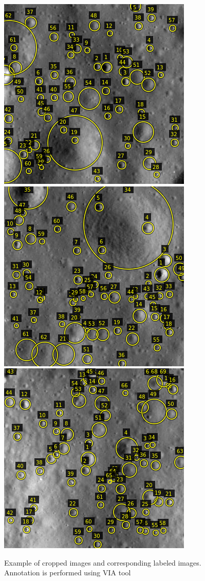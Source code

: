 \documentclass[11pt]{article}
\begin{document}
\begin{figure}[ht!]
	\includegraphics[width=.3\textwidth]{files/annotation/66n.png}\hfill
	\includegraphics[width=.3\textwidth]{files/annotation/29n.png}\hfill
	\includegraphics[width=.3\textwidth]{files/annotation/20n.png}
	\caption{Example of cropped images and corresponding labeled images. Annotation is performed using VIA tool}
	\label{an}
\end{figure}
\end{document}

